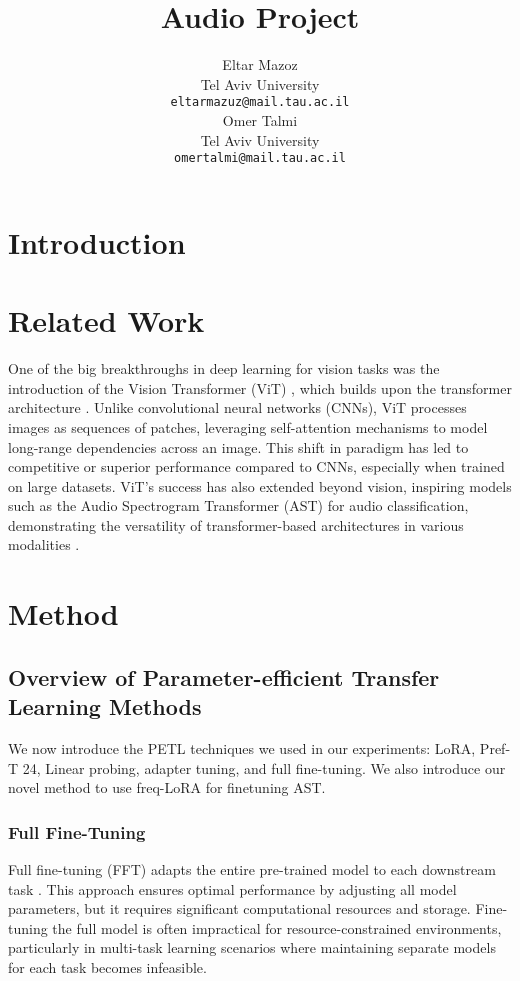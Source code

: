 \documentclass[11pt]{article}
\title{Audio Project}
\author{Eltar Mazoz \\
  Tel Aviv University \\
  \texttt{eltarmazuz@mail.tau.ac.il} \\\And
  Omer Talmi \\
  Tel Aviv University \\
  \texttt{omertalmi@mail.tau.ac.il} \\}
\begin{document}
\maketitle
\begin{abstract}

\end{abstract}

\section{Introduction}


\section{Related Work}
One of the big breakthroughs in deep learning for vision tasks was the introduction of the Vision Transformer (ViT) \cite{dosovitskiy2020image}, which builds upon the transformer architecture \cite{vaswani2017attention}. Unlike convolutional neural networks (CNNs), ViT processes images as sequences of patches, leveraging self-attention mechanisms to model long-range dependencies across an image. This shift in paradigm has led to competitive or superior performance compared to CNNs, especially when trained on large datasets. ViT’s success has also extended beyond vision, inspiring models such as the Audio Spectrogram Transformer (AST) for audio classification, demonstrating the versatility of transformer-based architectures in various modalities \cite{gong2021ast}.


\section{Method}
\subsection{Overview of Parameter-efficient Transfer Learning Methods}

We now introduce the PETL techniques we used in our experiments: LoRA, Pref-T 24, Linear probing, adapter tuning, and full fine-tuning.
We also introduce our novel method to use freq-LoRA for finetuning AST.

\subsubsection{Full Fine-Tuning}
Full fine-tuning (FFT) adapts the entire pre-trained model to each downstream task \cite{xu2023parameter}. This approach ensures optimal performance by adjusting all model parameters, but it requires significant computational resources and storage. Fine-tuning the full model is often impractical for resource-constrained environments, particularly in multi-task learning scenarios where maintaining separate models for each task becomes infeasible.
\end{document}

